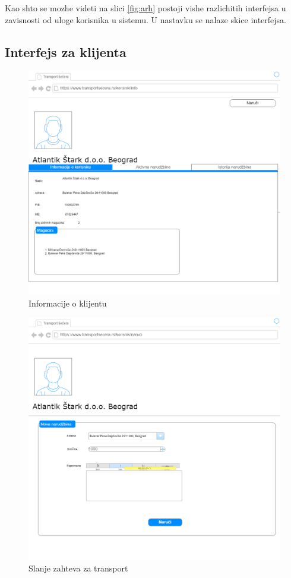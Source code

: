 Kao shto se mozhe videti na slici \ref{fig:arh} postoji vishe razlichitih interfejsa u zavisnosti od uloge korisnika u sistemu. U nastavku se nalaze skice interfejsa.

\subsection{Interfejs za klijenta}
\begin{figure}[H]
    \centering
    \includegraphics[scale=0.3]{Slike/KorisnickiInterfejs/Korisnik/korisnikInfo.png}
    \caption{Informacije o klijentu}
    \label{fig:klijentInfo}
\end{figure}

\begin{figure}[H]
    \centering
    \includegraphics[scale=0.25]{Slike/KorisnickiInterfejs/Korisnik/korisnikNaruci.png}
    \caption{Slanje zahteva za transport}
    \label{fig:klijentNaruci}
\end{figure}

